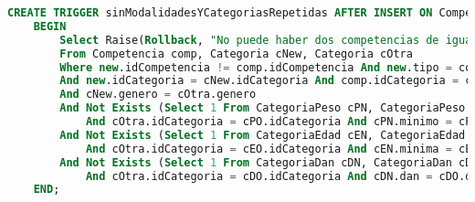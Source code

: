 \begin{lstlisting}[language=SQL]
CREATE TRIGGER sinModalidadesYCategoriasRepetidas AFTER INSERT ON Competencia
    BEGIN
        Select Raise(Rollback, "No puede haber dos competencias de igual modalidad y con categorias iguales .")
        From Competencia comp, Categoria cNew, Categoria cOtra
        Where new.idCompetencia != comp.idCompetencia And new.tipo = comp.tipo 
        And new.idCategoria = cNew.idCategoria And comp.idCategoria = cOtra.idCategoria 
        And cNew.genero = cOtra.genero
        And Not Exists (Select 1 From CategoriaPeso cPN, CategoriaPeso cPO Where cNew.idCategoria = cPN.idCategoria 
            And cOtra.idCategoria = cPO.idCategoria And cPN.minimo = cPO.minimo And cPN.maximo = cPO.maximo)
        And Not Exists (Select 1 From CategoriaEdad cEN, CategoriaEdad cEO Where cNew.idCategoria = cEN.idCategoria 
            And cOtra.idCategoria = cEO.idCategoria And cEN.minima = cEO.minima And cEN.maxima = cEO.maxima)
        And Not Exists (Select 1 From CategoriaDan cDN, CategoriaDan cDO Where cNew.idCategoria = cDN.idCategoria 
            And cOtra.idCategoria = cDO.idCategoria And cDN.dan = cDO.dan);
    END;
\end{lstlisting}
